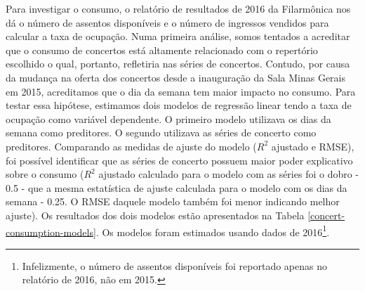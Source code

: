 \documentclass[a4paper, 12pt, openright, oneside, german, french, english, brazil]{abntex2}
\begin{document}
	Para investigar o consumo, o relatório de resultados de 2016 da Filarmônica nos dá o número de assentos disponíveis e o número de ingressos vendidos para calcular a taxa de ocupação. Numa primeira análise, somos tentados a acreditar que o consumo de concertos está altamente relacionado com o repertório escolhido o qual, portanto, refletiria nas séries de concertos. Contudo, por causa da mudança na oferta dos concertos desde a inauguração da Sala Minas Gerais em 2015, acreditamos que o dia da semana tem maior impacto no consumo. Para testar essa hipótese, estimamos dois modelos de regressão linear tendo a taxa de ocupação como variável dependente. O primeiro modelo utilizava os dias da semana como preditores. O segundo utilizava as séries de concerto como preditores. Comparando as medidas de ajuste do modelo ($R^2$ ajustado e RMSE), foi possível identificar que as séries de concerto possuem maior poder explicativo sobre o consumo ($R^2$ ajustado calculado para o modelo com as séries foi o dobro - 0.5 - que a mesma estatística de ajuste calculada para o modelo com os dias da semana - 0.25. O RMSE daquele modelo também foi menor indicando melhor ajuste). Os resultados dos dois modelos estão apresentados na  Tabela \ref{concert-consumption-models}. Os modelos foram estimados usando dados de 2016\footnote{Infelizmente, o número de assentos disponíveis foi reportado apenas no relatório de 2016, não em 2015.}.
\end{document}
